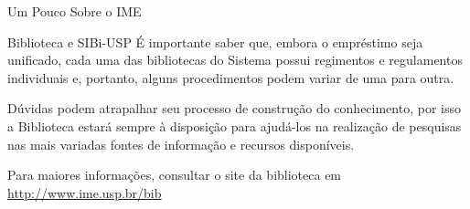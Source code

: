 \begin{secao}{Um Pouco Sobre o IME}
\begin{subsecao}{Biblioteca e SIBi-USP}
É importante saber que, embora o empréstimo seja unificado, cada uma das
bibliotecas do Sistema possui regimentos e regulamentos individuais e,
portanto, alguns procedimentos podem variar de uma para outra.

Dúvidas podem atrapalhar seu processo de construção do conhecimento, por isso
a Biblioteca estará sempre à disposição para ajudá-los na realização de
pesquisas nas mais variadas fontes de informação e recursos disponíveis.

Para maiores informações, consultar o site da biblioteca em
\url{http://www.ime.usp.br/bib}

\end{subsecao}
\end{secao}
